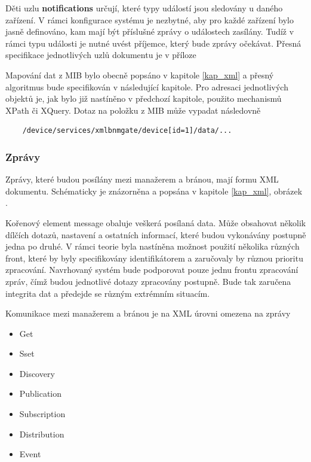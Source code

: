 Děti uzlu \textbf{notifications} určují, které typy událostí jsou sledovány u daného zařízení. V rámci konfigurace systému je nezbytné, aby pro každé zařízení
bylo jasně definováno, kam mají být příslušné zprávy o událostech zasílány. Tudíž v rámci typu události je nutné uvést příjemce, který bude zprávy očekávat. Přesná 
specifikace jednotlivých uzlů dokumentu je v příloze 

Mapování dat z MIB bylo obecně popsáno v kapitole \ref{kap_xml} a přesný algoritmus bude specifikován v následující kapitole. Pro adresaci jednotlivých objektů
je, jak bylo již nastíněno v předchozí kapitole, použito mechanismů XPath či XQuery. Dotaz na položku z MIB může vypadat následovně
\begin{verbatim}
	/device/services/xmlbnmgate/device[id=1]/data/...
\end{verbatim}

\subsubsection*{Zprávy}
Zprávy, které budou posílány mezi manažerem a bránou, mají formu XML dokumentu. Schématicky je znázorněna a popsána v kapitole \ref{kap_xml}, obrázek .

Kořenový element message obaluje veškerá posílaná data. Může obsahovat několik dílčích dotazů, nastavení a ostatních informací, které budou vykonávány postupně
jedna po druhé. V rámci teorie byla nastíněna možnost použití několika různých front, které by byly specifikovány identifikátorem a zaručovaly by různou
prioritu zpracování. Navrhovaný systém bude podporovat pouze jednu frontu zpracování zpráv, čímž budou jednotlivé dotazy zpracovány postupně. Bude tak zaručena
integrita dat a předejde se různým extrémním situacím.

Komunikace mezi manažerem a bránou je na XML úrovni omezena na zprávy
\begin{itemize}
	\item Get
	\item Sset
	\item Discovery
	\item Publication
	\item Subscription
	\item Distribution
	\item Event
\end{itemize}

